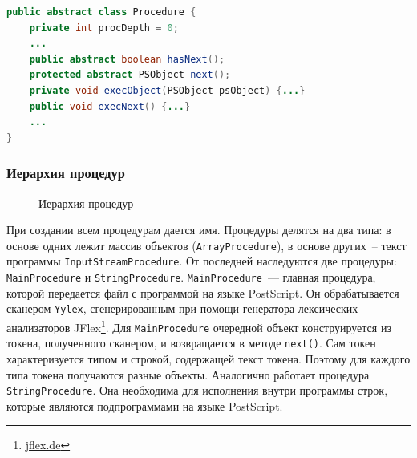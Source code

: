 \documentclass[14pt]{extarticle}
\begin{document}
\begin{lstlisting}[label=Procedure-listing,caption=Абстракный класс Procedure, frame = none, language = Java]
public abstract class Procedure {
    private int procDepth = 0;
    ...
    public abstract boolean hasNext();
    protected abstract PSObject next(); 
    private void execObject(PSObject psObject) {...}
    public void execNext() {...}
    ...
}
\end{lstlisting}

\subsubsection*{Иерархия процедур}
\begin{figure} [h]
\caption{Иерархия процедур}\label{procedures}
\end{figure}

При создании всем процедурам дается имя. Процедуры делятся на два типа: в основе одних лежит массив объектов (\texttt{ArrayProcedure}), в основе других~-- текст программы \texttt{InputStreamProcedure}. От последней наследуются две процедуры: \texttt{MainProcedure} и \texttt{StringProcedure}. \texttt{MainProcedure}~--- главная процедура, которой передается файл с программой на языке PostScript. Он обрабатывается сканером \texttt{Yylex}, сгенерированным при помощи генератора лексических анализаторов JFlex\footnote{\url{jflex.de}}. Для \texttt{MainProcedure} очередной объект конструируется из токена, полученного сканером, и возвращается в методе \texttt{next()}. Сам токен характеризуется типом и строкой, содержащей текст токена. Поэтому для каждого типа токена получаются разные объекты. Аналогично работает процедура \texttt{StringProcedure}. Она необходима для исполнения внутри программы строк, которые являются подпрограммами на языке PostScript.
\end{document}
